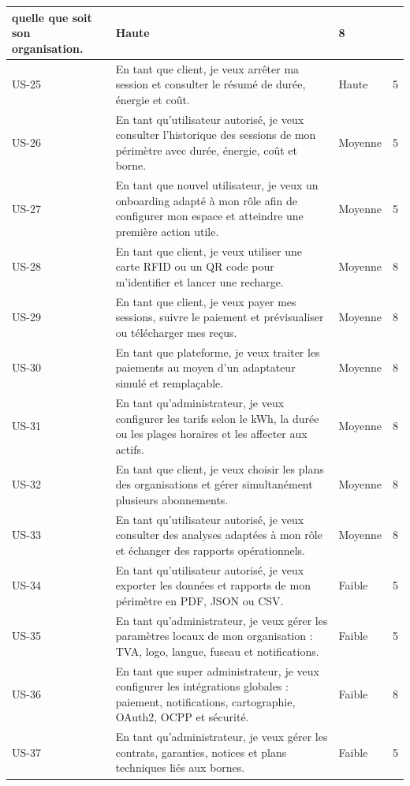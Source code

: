 \begin{longtable}{|C{1.25cm}|p{10.25cm}|C{1.65cm}|C{1.0cm}|}
  quelle que soit son organisation. & Haute & 8\\\hline
  US-25 & En tant que client, je veux arrêter ma session et consulter le résumé de
  durée, énergie et coût. & Haute & 5\\\hline
  US-26 & En tant qu'utilisateur autorisé, je veux consulter l'historique des sessions
  de mon périmètre avec durée, énergie, coût et borne. & Moyenne & 5\\\hline
  US-27 & En tant que nouvel utilisateur, je veux un onboarding adapté à mon rôle afin
  de configurer mon espace et atteindre une première action utile. & Moyenne & 5\\\hline
  US-28 & En tant que client, je veux utiliser une carte RFID ou un QR code pour
  m'identifier et lancer une recharge. & Moyenne & 8\\\hline
  US-29 & En tant que client, je veux payer mes sessions, suivre le paiement et
  prévisualiser ou télécharger mes reçus. & Moyenne & 8\\\hline
  US-30 & En tant que plateforme, je veux traiter les paiements au moyen d'un adaptateur
  simulé et remplaçable. & Moyenne & 8\\\hline
  US-31 & En tant qu'administrateur, je veux configurer les tarifs selon le kWh, la
  durée ou les plages horaires et les affecter aux actifs. & Moyenne & 8\\\hline
  US-32 & En tant que client, je veux choisir les plans des organisations et gérer
  simultanément plusieurs abonnements. & Moyenne & 8\\\hline
  US-33 & En tant qu'utilisateur autorisé, je veux consulter des analyses adaptées à
  mon rôle et échanger des rapports opérationnels. & Moyenne & 8\\\hline
  US-34 & En tant qu'utilisateur autorisé, je veux exporter les données et rapports de
  mon périmètre en PDF, JSON ou CSV. & Faible & 5\\\hline
  US-35 & En tant qu'administrateur, je veux gérer les paramètres locaux de mon
  organisation : TVA, logo, langue, fuseau et notifications. & Faible & 5\\\hline
  US-36 & En tant que super administrateur, je veux configurer les intégrations
  globales : paiement, notifications, cartographie, OAuth2, OCPP et sécurité. & Faible & 8\\\hline
  US-37 & En tant qu'administrateur, je veux gérer les contrats, garanties, notices et
  plans techniques liés aux bornes. & Faible & 5\\\hline

\end{longtable}
